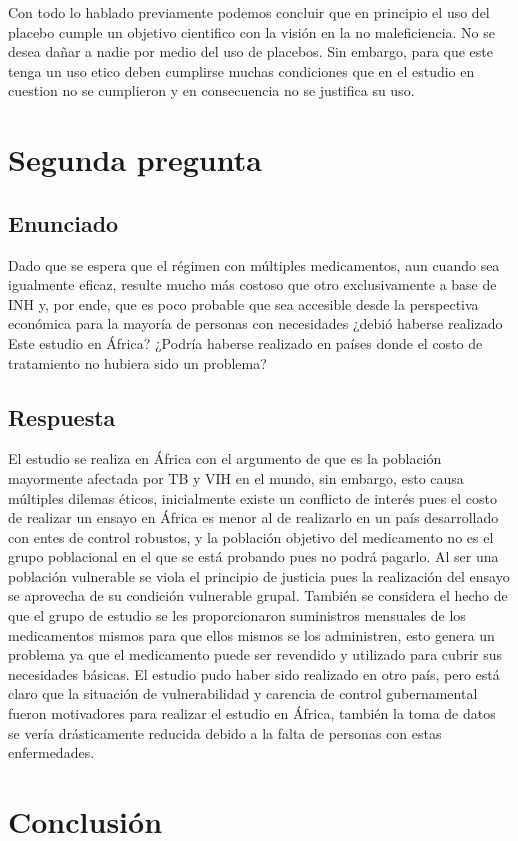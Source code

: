 Con  todo lo hablado previamente podemos concluir que en principio el uso del placebo cumple un objetivo cientifico con la visión en la no maleficiencia. No se desea dañar a nadie por medio del uso de placebos. Sin embargo, para que este tenga un uso etico deben cumplirse muchas condiciones que en el estudio en cuestion no se cumplieron y en consecuencia no se justifica su uso.

\section*{Segunda pregunta}
\subsection*{Enunciado}
Dado que se espera que el régimen con múltiples medicamentos, aun cuando sea igualmente eficaz, resulte mucho más costoso que otro exclusivamente a base de
INH y, por ende, que es poco probable que sea accesible desde la perspectiva económica para la mayoría de personas con necesidades ¿debió haberse realizado
Este estudio en África? ¿Podría haberse realizado en países donde el costo de tratamiento no hubiera sido un problema?

\subsection*{Respuesta}
El estudio se realiza en África con el argumento de que es la población mayormente afectada por TB y VIH en el mundo, sin embargo, esto causa múltiples dilemas éticos, inicialmente existe un conflicto de interés pues el costo de realizar un ensayo en África es menor al de realizarlo en un país desarrollado con entes de control robustos, y la población objetivo del medicamento no es el grupo poblacional en el que se está probando pues no podrá pagarlo. Al ser una población vulnerable se viola el principio de justicia pues la realización del ensayo se aprovecha de su condición vulnerable grupal. También se considera el hecho de que el grupo de estudio se les proporcionaron suministros mensuales de los medicamentos mismos para que ellos mismos se los administren, esto genera un problema ya que el medicamento puede ser revendido y utilizado para cubrir sus necesidades básicas. El estudio pudo haber sido realizado en otro país, pero está claro que la situación de vulnerabilidad y carencia de control gubernamental fueron motivadores para realizar el estudio en África, también la toma de datos se vería drásticamente reducida debido a la falta de personas con estas enfermedades.

\section*{Conclusión}

